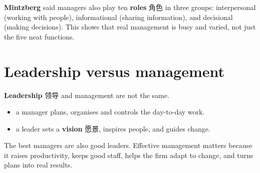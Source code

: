 \documentclass[11pt]{article}
\begin{document}
\textbf{Mintzberg} said managers also play ten \textbf{roles} 角色 in three groups: interpersonal (working with people), informational (sharing information), and decisional (making decisions). This shows that real management is busy and varied, not just the five neat functions.

\section*{Leadership versus management}

\textbf{Leadership} 领导 and management are not the same.

\begin{itemize}
\item a manager plans, organises and controls the day-to-day work.

\item a leader sets a \textbf{vision} 愿景, inspires people, and guides change.

\end{itemize}

The best managers are also good leaders. Effective management matters because it raises productivity, keeps good staff, helps the firm adapt to change, and turns plans into real results.
\end{document}
